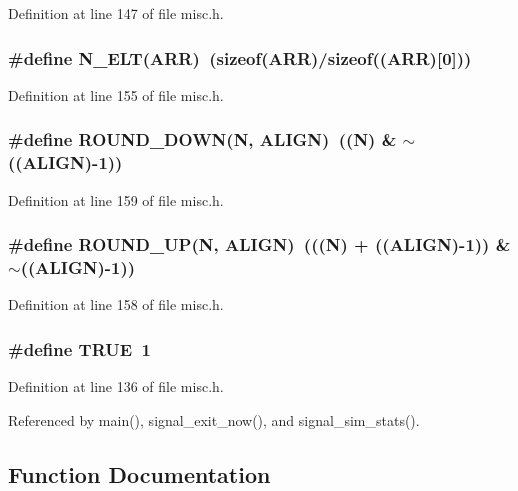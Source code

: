 Definition at line 147 of file misc.h.
\subsubsection[{N\_\-ELT}]{\setlength{\rightskip}{0pt plus 5cm}\#define N\_\-ELT(ARR)~(sizeof(ARR)/sizeof((ARR)[0]))}\label{misc_8h_0b016faa2169c3e72ef5de317c167530}




Definition at line 155 of file misc.h.
\subsubsection[{ROUND\_\-DOWN}]{\setlength{\rightskip}{0pt plus 5cm}\#define ROUND\_\-DOWN(N, \/  ALIGN)~((N) \& $\sim$((ALIGN)-1))}\label{misc_8h_2e8ad71bbbfff9966240088f9f711927}




Definition at line 159 of file misc.h.
\subsubsection[{ROUND\_\-UP}]{\setlength{\rightskip}{0pt plus 5cm}\#define ROUND\_\-UP(N, \/  ALIGN)~(((N) + ((ALIGN)-1)) \& $\sim$((ALIGN)-1))}\label{misc_8h_9f347f87831ee6090cb91ac703808537}




Definition at line 158 of file misc.h.
\subsubsection[{TRUE}]{\setlength{\rightskip}{0pt plus 5cm}\#define TRUE~1}\label{misc_8h_a8cecfc5c5c054d2875c03e77b7be15d}




Definition at line 136 of file misc.h.

Referenced by main(), signal\_\-exit\_\-now(), and signal\_\-sim\_\-stats().

\subsection{Function Documentation}
